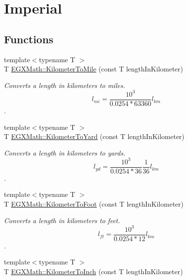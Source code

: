 \hypertarget{group___e_g_x_math-_conversions-_length_conversions-_kilometer-_imperial}{}\section{Imperial}
\label{group___e_g_x_math-_conversions-_length_conversions-_kilometer-_imperial}
\subsection*{Functions}
\begin{DoxyCompactItemize}
\item 
{\footnotesize template$<$typename T $>$ }\\T \mbox{\hyperlink{group___e_g_x_math-_conversions-_length_conversions-_kilometer-_imperial_ga781cd502fe13eb76e4e6b8e1fa7d55ed}{E\+G\+X\+Math\+::\+Kilometer\+To\+Mile}} (const T length\+In\+Kilometer)
\begin{DoxyCompactList}\small\item\em Converts a length in kilometers to miles. \[ l_{mi}=\frac{10^{3}}{0.0254 * 63360} l_{km} \]. \end{DoxyCompactList}\item 
{\footnotesize template$<$typename T $>$ }\\T \mbox{\hyperlink{group___e_g_x_math-_conversions-_length_conversions-_kilometer-_imperial_ga98f724c96246bb6dcb517fc64ff5ade1}{E\+G\+X\+Math\+::\+Kilometer\+To\+Yard}} (const T length\+In\+Kilometer)
\begin{DoxyCompactList}\small\item\em Converts a length in kilometers to yards. \[ l_{yd}= \frac{10^{3}}{0.0254 * 36} \frac{1}{36} l_{km} \]. \end{DoxyCompactList}\item 
{\footnotesize template$<$typename T $>$ }\\T \mbox{\hyperlink{group___e_g_x_math-_conversions-_length_conversions-_kilometer-_imperial_ga8e07a35f01e011462db88b5cb2896416}{E\+G\+X\+Math\+::\+Kilometer\+To\+Foot}} (const T length\+In\+Kilometer)
\begin{DoxyCompactList}\small\item\em Converts a length in kilometers to feet. \[ l_{ft}= \frac{10^{3}}{0.0254 * 12} l_{km} \]. \end{DoxyCompactList}\item 
{\footnotesize template$<$typename T $>$ }\\T \mbox{\hyperlink{group___e_g_x_math-_conversions-_length_conversions-_kilometer-_imperial_ga6f1d41be3b2039495abff4f256148aa7}{E\+G\+X\+Math\+::\+Kilometer\+To\+Inch}} (const T length\+In\+Kilometer)

\end{DoxyCompactItemize}
